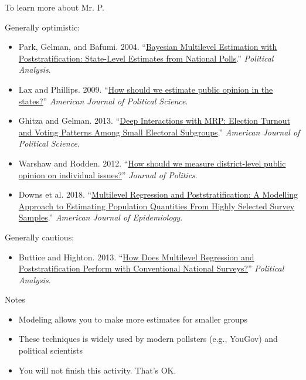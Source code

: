 \documentclass[aspectratio=169]{beamer}
\begin{document}
\begin{frame}{To learn more about Mr. P.}

{\footnotesize
Generally optimistic:
\begin{itemize}
\item Park, Gelman, and Bafumi. 2004. ``\textcolor{blue}{\href{https://www.jstor.org/stable/25791784}{Bayesian Multilevel Estimation with Poststratification: State-Level Estimates from National Polls}}.'' \textit{Political Analysis}.
\item Lax and Phillips. 2009. ``\textcolor{blue}{\href{https://www.jstor.org/stable/25193870}{How should we estimate public opinion in the states?}}'' \textit{American Journal of Political Science}.
\item Ghitza and Gelman. 2013. ``\textcolor{blue}{\href{https://www.jstor.org/stable/23496652}{Deep Interactions with MRP: Election Turnout and Voting Patterns Among Small Electoral Subgroups}}.'' \textit{American Journal of Political Science}.
\item Warshaw and Rodden. 2012. ``\textcolor{blue}{\href{http://www.jstor.org/stable/10.1017/s0022381611001204}{How should we measure district-level public opinion on individual issues?}}'' \textit{Journal of Politics}.
\item Downs et al. 2018. ``\textcolor{blue}{\href{https://doi.org/10.1093/aje/kwy070}{Multilevel Regression and Poststratification: A Modelling Approach to Estimating Population Quantities From Highly Selected Survey Samples}}.'' \textit{American Journal of Epidemiology}.
\end{itemize}
Generally cautious:
\begin{itemize}
\item Buttice and Highton. 2013. ``\textcolor{blue}{\href{http://www.jstor.org/stable/24572674}{How Does Multilevel Regression and Poststratification Perform with Conventional National Surveys?}}'' \textit{Political Analysis}.
\end{itemize}
}

\end{frame}
\begin{frame}{Notes}

\begin{itemize}
\item Modeling allows you to make more estimates for smaller groups \pause
\item These techniques is widely used by modern pollsters (e.g., YouGov) and political scientists \pause
\item You will not finish this activity.  That's OK.

\end{itemize}
\end{frame}
\end{document}
